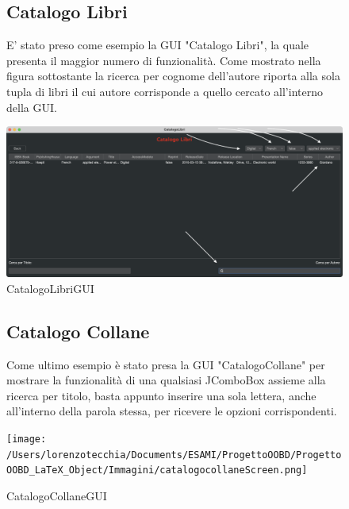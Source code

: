 \begin{figure}[hbt]
\subsection{Catalogo Libri}
E' stato preso come esempio la GUI "Catalogo Libri", la quale presenta il maggior numero di funzionalità. Come mostrato nella figura sottostante la ricerca per cognome dell'autore riporta alla sola tupla di libri il cui autore corrisponde a quello cercato all'interno della GUI.
\begin{center}
\includegraphics[width=\textwidth]{Immagini/catalogolibriScreen.png}
  \caption{CatalogoLibriGUI}
	
\end{center}
  \end{figure}

\begin{figure}[hbt]
\subsection{Catalogo Collane}
Come ultimo esempio è stato presa la GUI "CatalogoCollane" per mostrare la funzionalità di una qualsiasi JComboBox assieme alla ricerca per titolo, basta appunto inserire una sola lettera, anche all'interno della parola stessa, per ricevere le opzioni corrispondenti.
\begin{center}
\texttt{[image: /Users/lorenzotecchia/Documents/ESAMI/ProgettoOOBD/ProgettoOOBD\_LaTeX\_Object/Immagini/catalogocollaneScreen.png]}
  \caption{CatalogoCollaneGUI}	
\end{center}
  
\end{figure}

